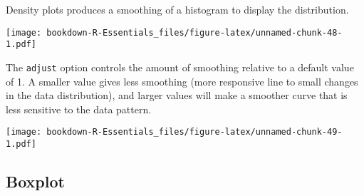 \documentclass[]{book}
\newenvironment{Shaded}{\begin{snugshade}}{\end{snugshade}}
\newcommand{\KeywordTok}[1]{\textcolor[rgb]{0.13,0.29,0.53}{\textbf{#1}}}
\newcommand{\DataTypeTok}[1]{\textcolor[rgb]{0.13,0.29,0.53}{#1}}
\newcommand{\DecValTok}[1]{\textcolor[rgb]{0.00,0.00,0.81}{#1}}
\newcommand{\FloatTok}[1]{\textcolor[rgb]{0.00,0.00,0.81}{#1}}
\newcommand{\StringTok}[1]{\textcolor[rgb]{0.31,0.60,0.02}{#1}}
\newcommand{\CommentTok}[1]{\textcolor[rgb]{0.56,0.35,0.01}{\textit{#1}}}
\newcommand{\OperatorTok}[1]{\textcolor[rgb]{0.81,0.36,0.00}{\textbf{#1}}}
\newcommand{\NormalTok}[1]{#1}
\begin{document}
Density plots produces a smoothing of a histogram to display the
distribution.

\begin{Shaded}
\end{Shaded}

\texttt{[image: bookdown-R-Essentials\_files/figure-latex/unnamed-chunk-48-1.pdf]}

The \texttt{adjust} option controls the amount of smoothing relative to
a default value of 1. A smaller value gives less smoothing (more
responsive line to small changes in the data distribution), and larger
values will make a smoother curve that is less sensitive to the data
pattern.

\begin{Shaded}
\end{Shaded}

\texttt{[image: bookdown-R-Essentials\_files/figure-latex/unnamed-chunk-49-1.pdf]}

\subsection{Boxplot}\label{boxplot}
\end{document}
